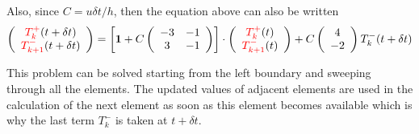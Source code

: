 Also, since $C=u \delta t / h $, then the equation above can also 
be written
\begin{eqnarray}
\left(
\begin{array}{cc}
{\color{red} T_k^+}(t+\delta t)  \\
{\color{red}T_{k+1}^-} (t+\delta t) 
\end{array}
\right)=
\left[
{\bm 1} + 
C
\left(\begin{array}{cc}
    -3 & -1 \\
     3 & -1
\end{array}
\right)
\right]\cdot
\left(
\begin{array}{cc}
{\color{red}T_k^+} (t) \\
{\color{red}T_{k+1}^-} (t)
\end{array}
\right) + 
C \left(
\begin{array}{cc}
     4   \\
     -2 
\end{array}
\right)T_k^- (t+\delta t) 
\end{eqnarray}






This problem can be solved starting from the left boundary and sweeping through all 
the elements. The updated values of adjacent elements are used in the calculation of 
the next element as soon as this element becomes available which is why 
the last term $T_k^-$ is taken  at $t+\delta t$.
